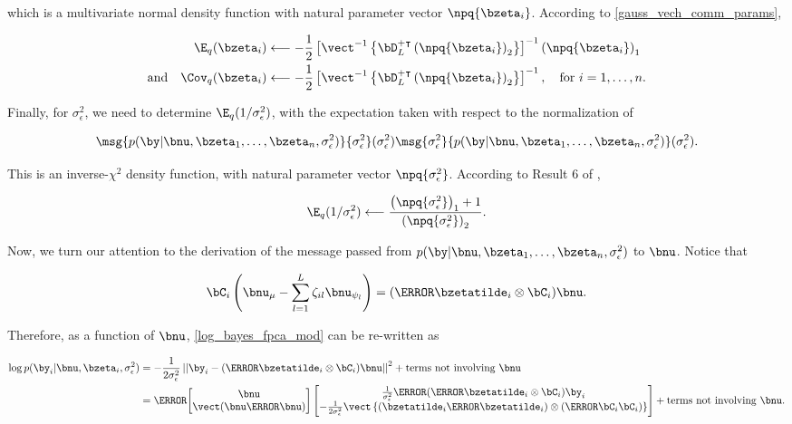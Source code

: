 \documentclass[12pt]{article}
\theoremstyle{plain}
\theoremstyle{definition}
\theoremstyle{remark}
\def\sigsqeps{\sigma^2_{\epsilon}}
\def\numu{\bnu_\mu}
\newcommand\nupsi[1]{\bnu_{\psi_{#1}}}
\newcommand\tni[1]{\text{terms not involving $#1$}}
\begin{document}
\noindent which is a multivariate normal density function with natural parameter vector $\npq{\bzeta_i}$.
According to \eqref{gauss_vech_comm_params},

\begin{align}
\begin{split}
	\E_q (\bzeta_i)
		&\longleftarrow
			-\frac12 \left[
				\vect^{-1} \left\{
					\bD_L^{+ \intercal}
					\left( \npq{\bzeta_i} \right)_2
				\right\}
			\right]^{-1} \left( \npq{\bzeta_i} \right)_1 \\
	\text{and} \quad
	\Cov_q (\bzeta_i)
		&\longleftarrow
			-\frac12 \left[
				\vect^{-1} \left\{
					\bD_L^{+ \intercal}
					\left( \npq{\bzeta_i} \right)_2
				\right\}
			\right]^{-1}, \quad \text{for $i = 1, \dots, n$.}
\end{split}
\label{exp_lik_zeta}
\end{align}

\noindent Finally, for $\sigsqeps$, we need to determine $\E_q (1/\sigsqeps)$, with the expectation taken with
respect to the normalization of

\[
	\msg{p (\by | \bnu, \bzeta_1, \dots, \bzeta_n, \sigsqeps)}{\sigsqeps} (\sigsqeps)
	\msg{\sigsqeps}{p (\by | \bnu, \bzeta_1, \dots, \bzeta_n, \sigsqeps)} (\sigsqeps).
\]

\noindent This is an inverse-$\chi^2$ density function, with natural parameter vector $\npq{\sigsqeps}$.
According to Result 6 of \citet{maestrini20},

\[
	\E_q (1/\sigsqeps)
		\longleftarrow
			\frac{
				\left( \npq{\sigsqeps} \right)_1 + 1
			}{
				\left( \npq{\sigsqeps} \right)_2
			}.
\]

Now, we turn our attention to the derivation of the message passed from $p (\by | \bnu, \bzeta_1, \dots, \bzeta_n,
\sigsqeps)$ to $\bnu$. Notice that

\begin{equation}
	\bC_i \left( \numu - \sum_{l=1}^L \zeta_{il} \nupsi{l} \right) = (\T{\bzetatilde_i} \otimes \bC_i) \bnu.
\label{theta_simplification}
\end{equation}

\noindent Therefore, as a function of $\bnu$, \eqref{log_bayes_fpca_mod} can be re-written as

\begin{align*}
	\log p (\by_i | \bnu, \bzeta_i, \sigsqeps)
		& = -\frac{1}{2\sigsqeps} \left|\left|
			\by_i - (\T{\bzetatilde_i} \otimes \bC_i) \bnu
		\right|\right|^2 + \tni{\bnu} \\
		& = \T{\begin{bmatrix}
			\bnu \\
			\vect (\bnu \T{\bnu})
		\end{bmatrix}} \begin{bmatrix}
			\frac{1}{\sigsqeps} \T{(\T{\bzetatilde_i} \otimes \bC_i)} \by_i \\
			-\frac{1}{2\sigsqeps} \vect \left\{
				(\bzetatilde_i \T{\bzetatilde_i}) \otimes (\T{\bC_i} \bC_i)
			\right\}
		\end{bmatrix} + \tni{\bnu}.
\end{align*}
\end{document}
